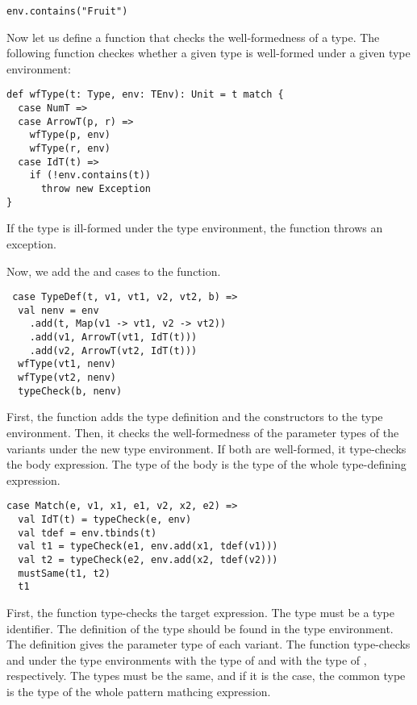 \begin{verbatim}
env.contains("Fruit")
\end{verbatim}

Now let us define a function that checks the well-formedness of a type.
The following  function checkes whether a given type is well-formed
under a given type environment:

\begin{verbatim}
def wfType(t: Type, env: TEnv): Unit = t match {
  case NumT =>
  case ArrowT(p, r) =>
    wfType(p, env)
    wfType(r, env)
  case IdT(t) =>
    if (!env.contains(t))
      throw new Exception
}
\end{verbatim}

If the type is ill-formed under the type environment, the function throws
an exception.

Now, we add the  and  cases to the  function.

\begin{verbatim}
 case TypeDef(t, v1, vt1, v2, vt2, b) =>
  val nenv = env
    .add(t, Map(v1 -> vt1, v2 -> vt2))
    .add(v1, ArrowT(vt1, IdT(t)))
    .add(v2, ArrowT(vt2, IdT(t)))
  wfType(vt1, nenv)
  wfType(vt2, nenv)
  typeCheck(b, nenv)
\end{verbatim}

First, the function adds the type definition and the constructors to the type
environment. Then, it checks the well-formedness of the parameter types of the
variants under the new type environment. If both are well-formed,
it type-checks the body expression. The type of the body is the type of the
whole type-defining expression.

\begin{verbatim}
case Match(e, v1, x1, e1, v2, x2, e2) =>
  val IdT(t) = typeCheck(e, env)
  val tdef = env.tbinds(t)
  val t1 = typeCheck(e1, env.add(x1, tdef(v1)))
  val t2 = typeCheck(e2, env.add(x2, tdef(v2)))
  mustSame(t1, t2)
  t1
\end{verbatim}

First, the function type-checks the target expression. The type must be
a type identifier. The definition of the type should be found in the type
environment. The definition gives the parameter type of each variant. The
function type-checks  and  under the type environments with the
type of  and with the type of , respectively.
The types must be the same, and if it is the case, the common
type is the type of the whole pattern mathcing expression.

